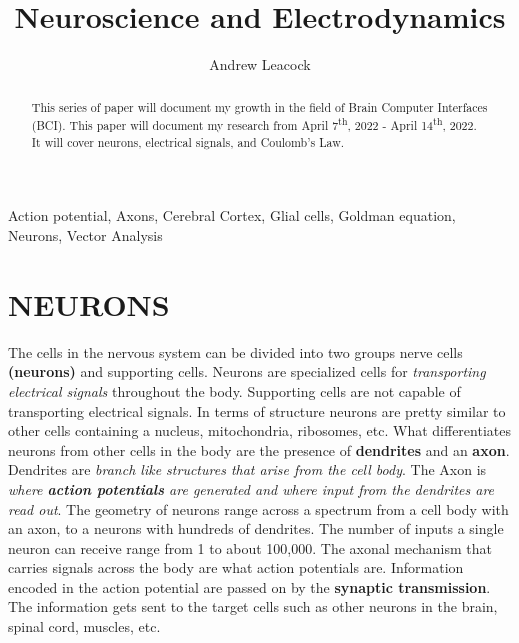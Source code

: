 \documentclass[english]{def}
\title{Neuroscience and Electrodynamics}
\author{Andrew Leacock
}
\begin{document}
\maketitle



\englishtitle

\begin{abstract}
	This series of paper will document my growth in the field of Brain Computer Interfaces (BCI). This paper will document my research from April 7\textsuperscript{th}, 2022 - April 14\textsuperscript{th}, 2022. It will cover neurons, electrical signals, and Coulomb’s Law.
\end{abstract}

\begin{keywords}
	Action potential, Axons, Cerebral Cortex, Glial cells, Goldman equation, Neurons, Vector Analysis
\end{keywords}

\let\thefootnote\relax\footnotetext{\hspace*{-5mm}}


\section{NEURONS}
The cells in the nervous system can be divided into two groups nerve cells \textbf{(neurons)} and supporting cells. Neurons are specialized cells for \emph{transporting electrical signals} throughout the body. Supporting cells are not capable of transporting electrical signals. In terms of structure neurons are pretty similar to other cells containing a nucleus, mitochondria, ribosomes, etc. What differentiates neurons from other cells in the body are the presence of \textbf{dendrites} and an \textbf{axon}. Dendrites are \emph{branch like structures that arise from the cell body}. The Axon is \emph{where \textbf{action potentials} are generated and where input from the dendrites are read out}. The geometry of neurons range across a spectrum from a cell body with an axon, to a neurons with hundreds of dendrites. The number of inputs a single neuron can receive range from 1 to about 100,000. The axonal mechanism that carries signals across the body are what action potentials are. Information encoded in the action potential are passed on by the \textbf{synaptic transmission}. The information gets sent to the target cells such as other neurons in the brain, spinal cord, muscles, etc. 
\end{document}
